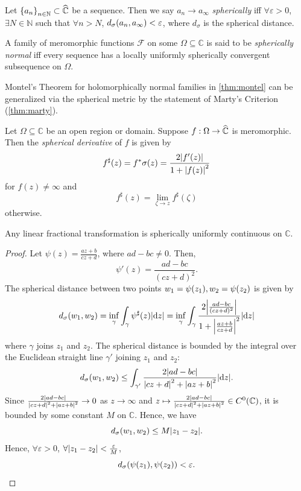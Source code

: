 Let \(\cbraces{a_n}_{n\in\mathbb{N}}\subset\extcomplex\) be a sequence. Then we say \(a_n\to a_\infty\) \emph{spherically} iff \(\forall\varepsilon>0\), \(\exists N\in\mathbb{N}\) such that \(\forall n>N\), \(d_\sigma\qty(a_n,a_\infty)<\varepsilon\), where \(d_\sigma\) is the spherical distance.
\begin{definition}
    A family of meromorphic functions \(\mathcal{F}\) on some \(\Omega\subseteq\mathbb{C}\) is said to be \textit{spherically normal} iff every sequence has a locally uniformly spherically convergent subsequence on \(\Omega\).
\end{definition}
Montel's Theorem for holomorphically normal families in \cref{thm:montel} can be generalized via the spherical metric by the statement of Marty's Criterion (\cref{thm:marty}).
\begin{definition}\label{def:sphericalderivative}
    Let \(\Omega\subseteq\mathbb{C}\) be an open region or domain. Suppose \(f:\Omega\to\widehat{\mathbb{C}}\) is meromorphic. Then the \textit{spherical derivative} of \(f\) is given by \[f^\sharp(z)=f^*\sigma(z)=\frac{2\abs{f'(z)}}{1+\abs{f(z)}^2}\] for \(f(z)\neq\infty\) and \[f^\sharp(z)=\lim_{\zeta\to z}f^\sharp(\zeta)\] otherwise.
\end{definition}
\begin{proposition}\label{prop:linearfractionaltransformationuniformlysphericallycontinuous}
    Any linear fractional transformation is spherically uniformly continuous on \(\mathbb{C}\).
\end{proposition}
\begin{proof}
    Let \(\psi(z)=\frac{az+b}{cz+d}\), where \(ad-bc\neq 0\). Then, \[\psi'(z)=\frac{ad-bc}{(cz+d)^2}.\]
    The spherical distance between two points \(w_1=\psi\qty(z_1),w_2=\psi\qty(z_2)\) is given by \[d_\sigma\qty(w_1,w_2)=\inf_{\gamma}\int_\gamma\psi^\sharp(z)\abs{\dd{z}}=\inf_{\gamma}\int_\gamma\frac{2\abs{\frac{ad-bc}{(cz+d)^2}}}{1+\abs{\frac{az+b}{cz+d}}^2}\abs{\dd{z}}\] where \(\gamma\) joins \(z_1\) and \(z_2\). The spherical distance is bounded by the integral over the Euclidean straight line \(\gamma'\) joining \(z_1\) and \(z_2\):
    \[d_\sigma\qty(w_1,w_2)\leq\int_{\gamma'}\frac{2\abs{ad-bc}}{\abs{cz+d}^2+\abs{az+b}^2}\abs{\dd{z}}.\] Since \(\frac{2\abs{ad-bc}}{\abs{cz+d}^2+\abs{az+b}^2}\to 0\) as \(z\to\infty\) and \(z\mapsto\frac{2\abs{ad-bc}}{\abs{cz+d}^2+\abs{az+b}^2}\in C^0(\mathbb{C})\), it is bounded by some constant \(M\) on \(\mathbb{C}\). Hence, we have \[d_\sigma\qty(w_1,w_2)\leq M\abs{z_1-z_2}.\] Hence, \(\forall\varepsilon>0\), \(\forall\abs{z_1-z_2}<\frac{\varepsilon}{M}\), \[d_\sigma\qty(\psi\qty(z_1),\psi\qty(z_2))<\varepsilon.\qedhere\]
\end{proof}
